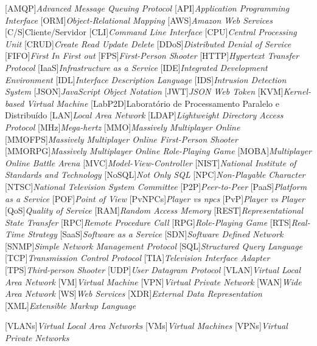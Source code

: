 \begin{acronym}[]
	[AMQP]{{\it Advanced Message Queuing Protocol}}
	[API]{{\it Application Programming Interface}}
	[ORM]{{\it Object-Relational Mapping}}
  	[AWS]{{\it Amazon Web Services}}
	[C/S]{{Cliente/Servidor}}
	[CLI]{{\it Command Line Interface}}
	[CPU]{{\it Central Processing Unit}}
	[CRUD]{{\it Create Read Update Delete}}
	[DDoS]{{\it Distributed Denial of Service}}
	[FIFO]{{\it First In First out}}
	[FPS]{{\it First-Person Shooter}}
	[HTTP]{{\it Hypertext Transfer Protocol}}
	[IaaS]{{\it Infrastructure as a Service}}
	[IDE]{{\it Integrated Development Environment}}
	[IDL]{{\it Interface Description Language}}
  	[IDS]{{\it Intrusion Detection System}}
	[JSON]{{\it JavaScript Object Notation}}
	[JWT]{{\it JSON Web Token}}
	[KVM]{{\it Kernel-based Virtual Machine}}
	[LabP2D]{{Laboratório de Processamento Paralelo e Distribuído}}
	[LAN]{{\it Local Area Network}}
  	[LDAP]{{\it Lightweight Directory Access Protocol}}
	[MHz]{{\it Mega-hertz}}
	[MMO]{{\it Massively Multiplayer Online}}
	[MMOFPS]{{\it Massively Multiplayer Online First-Person Shooter}}
	[MMORPG]{{\it Massively Multiplayer Online Role-Playing Game}}
	[MOBA]{{\it Multiplayer Online Battle Arena}}
	[MVC]{{\it Model-View-Controller}}
	[NIST]{{\it National Institute of Standards and Technology}}
	[NoSQL]{{\it Not Only SQL}}
	[NPC]{{\it Non-Playable Character}}
	[NTSC]{{\it National Television System Committee}}
	[P2P]{{\it Peer-to-Peer}}
	[PaaS]{{\it Platform as a Service}}
	[POF]{{\it Point of View}}
	[PvNPCs]{{\it Player vs \acp{npc}}}
	[PvP]{{\it Player vs Player}}
	[QoS]{{\it Quality of Service}}
	[RAM]{{\it Random Access Memory}}
	[REST]{{\it Representational State Transfer}}
	[RPC]{{\it Remote Procedure Call}}
	[RPG]{{\it Role-Playing Game}}
	[RTS]{{\it Real-Time Strategy}}
	[SaaS]{{\it Software as a Service}}
	[SDN]{{\it Software Defined Network}}
	[SNMP]{{\it Simple Network Management Protocol}}
	[SQL]{{\it Structured Query Language}}
	[TCP]{{\it Transmission Control Protocol}}
	[TIA]{{\it Television Interface Adapter}}
	[TPS]{{\it Third-person Shooter}}
	[UDP]{{\it User Datagram Protocol}}
	[VLAN]{{\it Virtual Local Area Network}}
	[VM]{{\it Virtual Machine}}
	[VPN]{{\it Virtual Private Network}}
	[WAN]{{\it Wide Area Network}}
	[WS]{{\it Web Services}}
	[XDR]{{\it External Data Representation}}
	[XML]{{\it Extensible Markup Language}}



	[VLANs]{{\it Virtual Local Area Networks}}
	[VMs]{{\it Virtual Machines}}
	[VPNs]{{\it Virtual Private Networks}}
\end{acronym}

